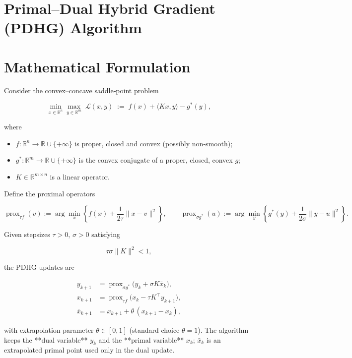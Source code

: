 \documentclass{article}
\begin{document}
\section*{Primal–Dual Hybrid Gradient (PDHG) Algorithm}

\section*{Mathematical Formulation}
Consider the convex–concave saddle‑point problem  

\[
\min_{x\in\mathbb{R}^n}\max_{y\in\mathbb{R}^m}
\;\mathcal{L}(x,y)\;:=\;f(x)+\langle Kx,y\rangle-g^{*}(y),
\tag{1}
\]

where  

\begin{itemize}
  \item $f:\mathbb{R}^{n}\!\to\!\mathbb{R}\cup\{+\infty\}$ is proper, closed and convex (possibly non‑smooth);
  \item $g^{*}:\mathbb{R}^{m}\!\to\!\mathbb{R}\cup\{+\infty\}$ is the convex conjugate of a proper, closed, convex $g$;
  \item $K\in\mathbb{R}^{m\times n}$ is a linear operator.
\end{itemize}

Define the proximal operators  

\[
\operatorname{prox}_{\tau f}(v):=\arg\min_{x}\left\{f(x)+\frac{1}{2\tau}\|x-v\|^{2}\right\},
\qquad
\operatorname{prox}_{\sigma g^{*}}(u):=\arg\min_{y}\left\{g^{*}(y)+\frac{1}{2\sigma}\|y-u\|^{2}\right\}.
\]

Given stepsizes $\tau>0$, $\sigma>0$ satisfying  

\[
\tau\sigma\|K\|^{2}<1,
\tag{2}
\]

the PDHG updates are  

\[
\boxed{
\begin{aligned}
y_{k+1}&=\operatorname{prox}_{\sigma g^{*}}\!\bigl(y_{k}+\sigma K\bar{x}_{k}\bigr),\\[2mm]
x_{k+1}&=\operatorname{prox}_{\tau f}\!\bigl(x_{k}-\tau K^{\!\top}y_{k+1}\bigr),\\[2mm]
\bar{x}_{k+1}&=x_{k+1}+\theta\,(x_{k+1}-x_{k}),
\end{aligned}}
\tag{3}
\]

with extrapolation parameter $\theta\in[0,1]$ (standard choice $\theta=1$).  
The algorithm keeps the **dual variable** $y_{k}$ and the **primal variable** $x_{k}$; $\bar{x}_{k}$ is an extrapolated primal point used only in the dual update.
\end{document}
